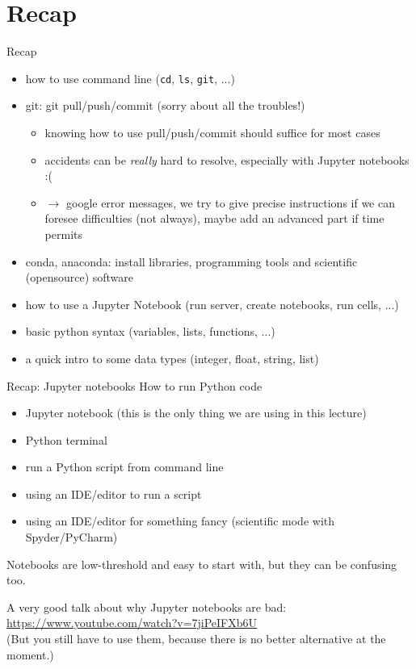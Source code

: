\section{Recap}
\begin{frame}[fragile]{Recap}
    \begin{itemize}[<+->]
        \item how to use command line (\verb|cd|, \verb|ls|, \verb|git|, ...)
        \item git: git pull/push/commit (sorry about all the troubles!)
	    \begin{itemize}
            \item knowing how to use pull/push/commit should suffice for most cases
            \item accidents can be \emph{really} hard to resolve, especially with Jupyter notebooks :(
            \item $\rightarrow$ google error messages, we try to give precise instructions if
                we can foresee difficulties (not always), maybe add an advanced part if time
                permits
	    \end{itemize}
        \item conda, anaconda: install libraries, programming tools and scientific (opensource) software
        \item how to use a Jupyter Notebook (run server, create notebooks, run cells, ...)
        \item basic python syntax (variables, lists, functions, ...)
        \item a quick intro to some data types (integer, float, string, list)
	\end{itemize}
\end{frame}

\begin{frame}[fragile]{Recap: Jupyter notebooks}
    How to run Python code
	\begin{itemize}
        \item Jupyter notebook (this is the only thing we are using in this lecture)
        \item Python terminal
        \item run a Python script from command line
        \item using an IDE/editor to run a script
        \item using an IDE/editor for something fancy (scientific mode with Spyder/PyCharm)
	\end{itemize}

    \pause
    Notebooks are low-threshold and easy to start with, but they can be confusing too.

    \bigskip
    A very good talk about why Jupyter notebooks are bad:
    \href{https://www.youtube.com/watch?v=7jiPeIFXb6U}{https://www.youtube.com/watch?v=7jiPeIFXb6U}\\
    \medskip
    {\small (But you still have to use them, because there is no better alternative at the
    moment.)}
\end{frame}


